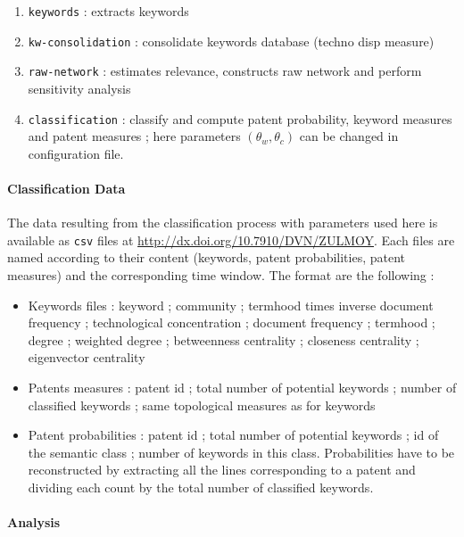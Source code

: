 \begin{enumerate}
\item \texttt{keywords} : extracts keywords
\item \texttt{kw-consolidation} : consolidate keywords database (techno disp measure)
\item \texttt{raw-network} : estimates relevance, constructs raw network and perform sensitivity analysis
\item \texttt{classification} : classify and compute patent probability, keyword measures and patent measures ; here parameters $(\theta_w,\theta_c)$ can be changed in configuration file.
\end{enumerate}



\paragraph{Classification Data}

The data resulting from the classification process with parameters used here is available as \texttt{csv} files at \url{http://dx.doi.org/10.7910/DVN/ZULMOY}. Each files are named according to their content (keywords, patent probabilities, patent measures) and the corresponding time window. The format are the following :

\begin{itemize}
\item Keywords files : keyword ; community ; termhood times inverse document frequency ; technological concentration ; document frequency ; termhood ; degree ; weighted degree ; betweenness centrality ; closeness centrality ; eigenvector centrality
\item Patents measures : patent id ; total number of potential keywords ; number of classified keywords ; same topological measures as for keywords
\item Patent probabilities : patent id ; total number of potential keywords ; id of the semantic class ; number of keywords in this class. Probabilities have to be reconstructed by extracting all the lines corresponding to a patent and dividing each count by the total number of classified keywords.
\end{itemize}




\paragraph{Analysis}

